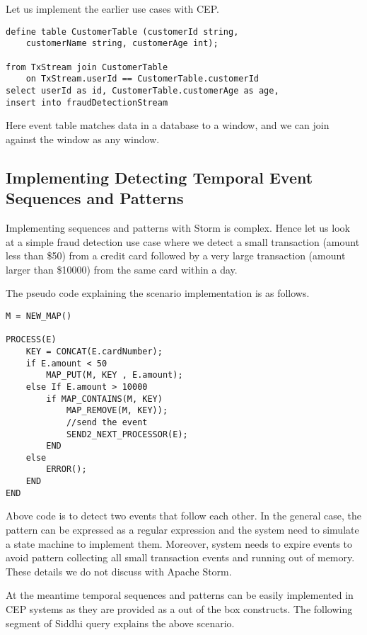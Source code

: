 \documentclass{sig-alternate}
\begin{document}
{Let us implement the earlier use cases with CEP.

\begin{lstlisting}[mathescape, showstringspaces=false]
define table CustomerTable (customerId string, 
	customerName string, customerAge int);

from TxStream join CustomerTable
	on TxStream.userId == CustomerTable.customerId
select userId as id, CustomerTable.customerAge as age, 
insert into fraudDetectionStream
\end{lstlisting} 

Here event table matches data in a database to a window, and we can join against the window as any window.

\subsection{Implementing Detecting Temporal Event Sequences and Patterns}

Implementing sequences and patterns with Storm is complex. Hence let us look at a simple  fraud detection use case where we detect a small transaction (amount less than \$50) from a credit card followed by a very large transaction (amount larger than \$10000) from the same card within a day. 

The pseudo code explaining the scenario implementation is as follows.
 
\begin{lstlisting}[mathescape,showstringspaces=false]
M = NEW_MAP()

PROCESS(E)  
	KEY = CONCAT(E.cardNumber); 
	if E.amount < 50
		MAP_PUT(M, KEY , E.amount); 
	else If E.amount > 10000
		if MAP_CONTAINS(M, KEY)
			MAP_REMOVE(M, KEY));
			//send the event		     
			SEND2_NEXT_PROCESSOR(E); 
		END
	else
		ERROR();
	END	
END
\end{lstlisting}  
 

Above code is to detect two events that follow each other. In the general case, the pattern can be expressed as a regular expression and the system need to simulate a state machine to implement them. Moreover, system needs to expire events to avoid pattern collecting all small transaction events and running out of memory. These details we do not discuss with Apache Storm. 

At the meantime  temporal sequences and patterns can be easily implemented in CEP systems as they are provided as a out of the box constructs. The following segment of Siddhi query explains the above scenario.


}
\end{document}
